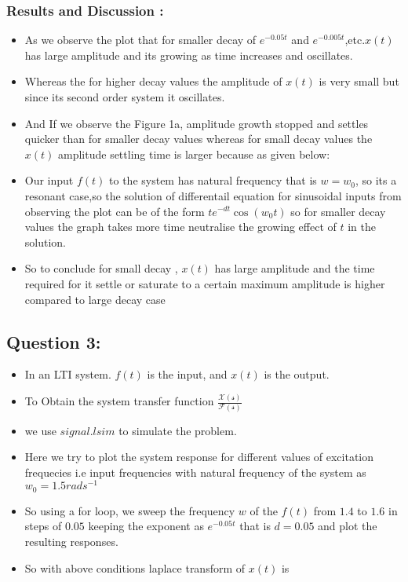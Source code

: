 \documentclass[11pt]{article}
\begin{document}
    \subsubsection{Results and Discussion :}\label{results-and-discussion}

\begin{itemize}
\item
  As we observe the plot that for smaller decay of \(e^{-0.05t}\) and
  \(e^{-0.005t}\),etc.\(x(t)\) has large amplitude and its growing as
  time increases and oscillates.
\item
  Whereas the for higher decay values the amplitude of \(x(t)\) is very
  small but since its second order system it oscillates.
\item
  And If we observe the Figure 1a, amplitude growth stopped and settles
  quicker than for smaller decay values whereas for small decay values
  the \(x(t)\) amplitude settling time is larger because as given below:
\item
  Our input \(f(t)\) to the system has natural frequency that is
  \(w=w_0\), so its a resonant case,so the solution of differentail
  equation for sinusoidal inputs from observing the plot can be of the
  form \(te^{-dt}\cos (w_0 t)\) so for smaller decay values the graph
  takes more time neutralise the growing effect of \(t\) in the
  solution.
\item
  So to conclude for small decay , \(x(t)\) has large amplitude and the
  time required for it settle or saturate to a certain maximum amplitude
  is higher compared to large decay case
\end{itemize}

    \subsection{Question 3:}\label{question-3}

\begin{itemize}
\item
  In an LTI system. \(f(t)\) is the input, and \(x(t)\) is the output.
\item
  To Obtain the system transfer function
  \(\frac{\mathcal {X(s)}}{ \mathcal {F(s)}}\)
\item
  we use \(signal.lsim\) to simulate the problem.
\item
  Here we try to plot the system response for different values of
  excitation frequecies i.e input frequencies with natural frequency of
  the system as \(w_0 = 1.5 rads^{-1}\)
\item
  So using a for loop, we sweep the frequency \(w\) of the \(f(t)\) from
  \(1.4\) to \(1.6\) in steps of \(0.05\) keeping the exponent as
  \(e^{−0.05t}\) that is \(d=0.05\) and plot the resulting responses.
\item
  So with above conditions laplace transform of \(x(t)\) is
\end{itemize}
\end{document}
